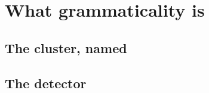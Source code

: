\chapter{What grammaticality is}

%
%

\section{The cluster, named}

%
%

\section{The detector}

%
%
%

